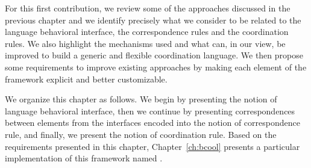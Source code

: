 For this first contribution, we review some of the approaches discussed in the previous chapter and we identify precisely what we consider to be related to the language behavioral interface, the correspondence rules and the coordination rules. We also highlight the mechanisms used and what can, in our view, be improved to build a generic and flexible coordination language.
We then propose some requirements to improve existing approaches by making each element of the framework explicit and better customizable.  

We organize this chapter as follows. We begin by presenting the notion of language behavioral interface, then we continue by presenting correspondences between elements from the interfaces encoded into the notion of correspondence rule, and finally, we present the notion of coordination rule. Based on the requirements presented in this chapter, Chapter~\ref{ch:bcool} presents a particular implementation of this framework named \bcool.

